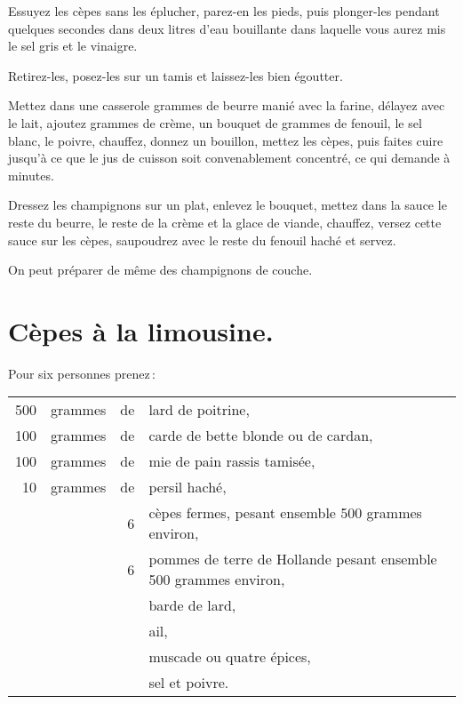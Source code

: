 Essuyez les cèpes sans les éplucher, parez-en les pieds, puis plonger-les
pendant quelques secondes dans deux litres d'eau bouillante dans laquelle vous
aurez mis le sel gris et le vinaigre.

Retirez-les, posez-les sur un tamis et laissez-les bien égoutter.

Mettez dans une casserole {\mmm} grammes de beurre manié avec la farine,
délayez avec le lait, ajoutez {\mmm} grammes de crème, un bouquet de
{\mmm} grammes de fenouil, le sel blanc, le poivre, chauffez, donnez un
bouillon, mettez les cèpes, puis faites cuire jusqu'à ce que le jus de cuisson
soit convenablement concentré, ce qui demande {\mmm} à {\mmm}
minutes.

Dressez les champignons sur un plat, enlevez le bouquet, mettez dans la sauce
le reste du beurre, le reste de la crème et la glace de viande, chauffez,
versez cette sauce sur les cèpes, saupoudrez avec le reste du fenouil haché et
servez.

\sk

On peut préparer de même des champignons de couche.

\section*{\centering Cèpes à la limousine.}
{}

Pour six personnes prenez :

\footnotesize
\begin{longtable}{rrrp{16em}}
    500 & grammes & de & lard de poitrine,                                                                \\
    100 & grammes & de & carde de bette blonde ou de cardan,                                              \\
    100 & grammes & de & mie de pain rassis tamisée,                                                      \\
     10 & grammes & de & persil haché,                                                                    \\
        &         &  6 & cèpes fermes, pesant ensemble 500 grammes environ,                               \\
        &         &  6 & pommes de terre de Hollande pesant ensemble 500 grammes environ,                 \\
        &         &    & barde de lard,                                                                   \\
        &         &    & ail,                                                                             \\
        &         &    & muscade ou quatre épices,                                                        \\
        &         &    & sel et poivre.                                                                   \\
\end{longtable}
\normalsize

